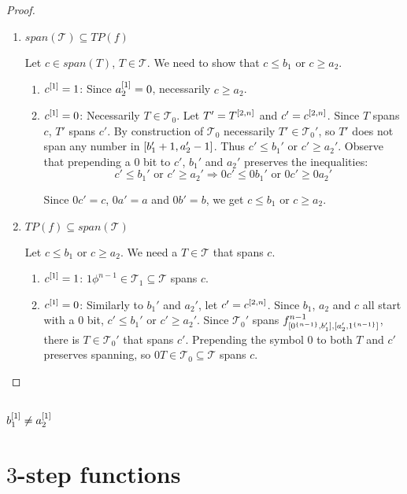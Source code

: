 \begin{proof}
\begin{enumerate}
\item{$span(\mathcal{T}) \subseteq TP(f)$}

Let $c \in span(T)$, $T \in \mathcal{T}$.
We need to show that $c \leq b_1$ or $c \geq a_2$.

\begin{enumerate}
\item $c^{[1]} = 1$: Since $a_2^{[1]} = 0$,
necessarily $c \geq a_2$.

\item $c^{[1]} = 0$: Necessarily $T \in \mathcal{T}_0$.
Let $T' = T^{[2, n]}$ and $c' = c^{[2, n]}$.
Since $T$ spans $c$, $T'$ spans $c'$.
By construction of $\mathcal{T}_0$
necessarily $T' \in \mathcal{T}_0'$,
so $T'$ does not span any number
in $[b_1' + 1, a_2' - 1]$.
Thus $c' \leq b_1'$ or $c' \geq a_2'$.
Observe that prepending a $0$ bit
to $c'$, $b_1'$ and $a_2'$
preserves the inequalities:
\[
c' \leq b_1' \text{ or } c' \geq a_2'
\Rightarrow
0 c' \leq 0 b_1' \text{ or } 0 c' \geq 0 a_2'
\]

Since $0 c' = c$, $0 a' = a$ and $0 b' = b$,
we get $c \leq b_1$ or $c \geq a_2$.
\end{enumerate}

\item{$TP(f) \subseteq span(\mathcal{T})$}

Let $c \leq b_1$ or $c \geq a_2$.
We need a $T \in \mathcal{T}$ that spans $c$.

\begin{enumerate}
\item $c^{[1]} = 1$:
$1 \phi^{n-1} \in \mathcal{T}_1 \subseteq \mathcal{T}$
spans $c$.

\item $c^{[1]} = 0$:
Similarly to $b_1'$ and $a_2'$, let $c' = c^{[2, n]}$.
Since $b_1$, $a_2$ and $c$ all start with a $0$ bit,
$c' \leq b_1'$ or $c' \geq a_2'$.
Since $\mathcal{T}_0'$ spans
$f^{n-1}_{[0^{\{n-1\}}, b_1'], [a_2', 1^{\{n-1\}}]}$,
there is $T \in \mathcal{T}_0'$ that spans $c'$.
Prepending the symbol $0$ to both $T$ and $c'$
preserves spanning,
so $0 T \in \mathcal{T}_0 \subseteq \mathcal{T}$ spans $c$.
\end{enumerate}

\end{enumerate}
\end{proof}

\subsection{\texorpdfstring{$b_1^{[1]}
\neq a_2^{[1]}$}
{b1[1] != a2[1]}
}

\section{\texorpdfstring{$3$}{3}-step functions}

